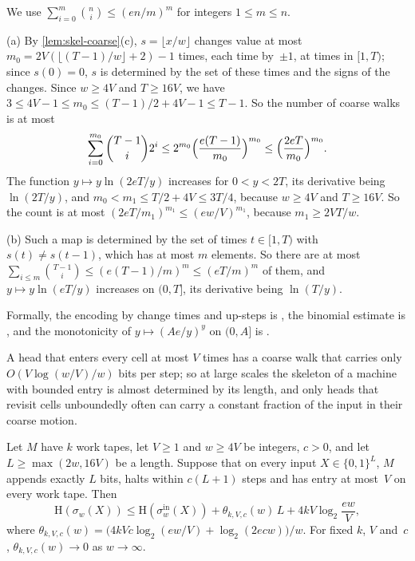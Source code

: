 \begin{outline}
We use $\sum_{i=0}^{m}\binom ni\le(en/m)^m$ for integers $1\le m\le n$.

(a) By \cref{lem:skel-coarse}(c), $s=\lfloor x/w\rfloor$ changes value at most $m_0=2V(\lfloor(T-1)/w\rfloor+2)-1$
times, each time by~$\pm1$, at times in $[1,T)$; since $s(0)=0$, $s$ is determined by the set of these times and the
signs of the changes. Since $w\ge4V$ and $T\ge16V$, we have $3\le4V-1\le m_0\le(T-1)/2+4V-1\le T-1$. So the number of
coarse walks is at most
\[
  \sum_{i=0}^{m_0}\binom{T-1}i2^i\le2^{m_0}\Bigl(\frac{e(T-1)}{m_0}\Bigr)^{m_0}\le\Bigl(\frac{2eT}{m_0}\Bigr)^{m_0} .
\]
The function $y\mapsto y\ln(2eT/y)$ increases for $0<y<2T$, its derivative being $\ln(2T/y)$, and
$m_0<m_1\le T/2+4V\le3T/4$, because $w\ge4V$ and $T\ge16V$. So the count is at most $(2eT/m_1)^{m_1}\le(ew/V)^{m_1}$,
because $m_1\ge2VT/w$.

(b) Such a map is determined by the set of times $t\in[1,T)$ with $s(t)\ne s(t-1)$, which has at most $m$ elements. So
there are at most $\sum_{i\le m}\binom{T-1}i\le(e(T-1)/m)^m\le(eT/m)^m$ of them, and $y\mapsto y\ln(eT/y)$ increases on
$(0,T]$, its derivative being $\ln(T/y)$.

Formally, the encoding by change times and up-steps is , the binomial estimate is
, and the monotonicity of $y\mapsto(Ae/y)^y$ on $(0,A]$ is
.
\end{outline}

A head that enters every cell at most $V$ times has a coarse walk that carries only $O(V\log(w/V)/w)$ bits per step; so
at large scales the skeleton of a machine with bounded entry is almost determined by its length, and only heads that
revisit cells unboundedly often can carry a constant fraction of the input in their coarse motion.

\begin{lemma}\label{lem:skel-entropy}
Let $M$ have $k$ work tapes, let $V\ge1$ and $w\ge4V$ be integers, $c>0$, and let $L\ge\max(2w,16V)$ be a length.
Suppose that on every input $X\in\{0,1\}^L$, $M$ appends exactly $L$ bits, halts within $c(L+1)$ steps and has entry at
most~$V$ on every work tape. Then
\[
  \mathrm H(\sigma_w(X))\le\mathrm H(\sigma^{\mathrm{in}}_w(X))+\theta_{k,V,c}(w)\,L+4kV\log_2\frac{ew}V,
\]
where $\theta_{k,V,c}(w)=\bigl(4kVc\log_2(ew/V)+\log_2(2ecw)\bigr)/w$. For fixed $k$, $V$ and~$c$,
$\theta_{k,V,c}(w)\to0$ as $w\to\infty$.
\end{lemma}

